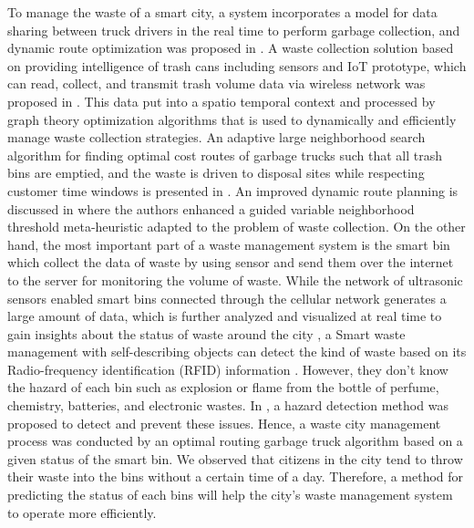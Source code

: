 \documentclass[conference,compsoc]{IEEEtran}
\begin{document}
\par To manage the waste of a smart city, a system incorporates a model for data sharing between truck drivers in the real time to perform garbage collection, and dynamic route optimization was proposed in \cite{Medvedev2015}. A waste collection solution based on providing intelligence of trash cans including sensors and IoT prototype, which can read, collect, and transmit trash volume data via wireless network was proposed in \cite{Gutierreza2015}\cite{Hong2014}. This data put into a spatio temporal context and processed by graph theory optimization algorithms that is used to dynamically and efficiently manage waste collection strategies. An adaptive large neighborhood search algorithm for finding optimal cost routes of garbage trucks such that all trash bins are emptied, and the waste is driven to disposal sites while respecting customer time windows is presented in \cite{Buhrkala212}. An improved dynamic route planning is discussed in \cite{Nuorito2006} where the authors enhanced a guided variable neighborhood threshold meta-heuristic adapted to the problem of waste collection. On the other hand, the most important part of a waste management system is the smart bin \cite{Sharma2015}\cite{Glouche2013}\cite{Sinhan2013} which collect the data of waste by using sensor and send them over the internet to the server for monitoring the volume of waste. While the network of ultrasonic sensors enabled smart bins connected through the cellular network generates a large amount of data, which is further analyzed and visualized at real time to gain insights about the status of waste around the city \cite{Sharma2015}, a Smart waste management with self-describing objects can detect the kind of waste based on its Radio-frequency identification (RFID) information \cite{Glouche2013}. However, they don't know the hazard of each bin such as explosion or flame from the bottle of perfume, chemistry, batteries, and electronic wastes. In \cite{Sinhan2013}, a hazard detection method was proposed to detect and prevent these issues. Hence, a waste city management process was conducted by an optimal routing garbage truck algorithm based on a given status of the smart bin. We observed that citizens in the city tend to throw their waste into the bins without a certain time of a day. Therefore, a method for predicting the status of each bins will help the city's waste management system to operate more efficiently.
 
\end{document}

